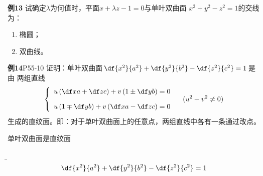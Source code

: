 \begin{frame}
	\linespread{1.2}
	\begin{exampleblock}{{\bf 例13}\hfill}
		试确定$\lambda$为何值时，平面$x+\lambda z-1=0$与单叶双曲面
		$x^2+y^2-z^2=1$的交线为：
		\begin{enumerate}
		  \item 椭圆；
		  \item 双曲线。
		\end{enumerate}
	\end{exampleblock}
\end{frame}

\begin{frame}
	\linespread{1.2}
	\begin{exampleblock}{{\bf 例14}\hfill P55-10}
		证明：单叶双曲面$\df{x^2}{a^2}+\df{y^2}{b^2}-\df{z^2}{c^2}=1$是由
		两组直线
		$$\left\{\begin{array}{l}
			u\left(\df xa+\df zc\right)+v\left(1\pm\df yb\right)=0\\[1em]
			u\left(1\mp\df yb\right)+v\left(\df xa-\df zc\right)=0
		\end{array}\right.\quad (u^2+v^2\ne 0)$$
		生成的直纹面。即：对于单叶双曲面上的任意点，两组直线中各有一条通过改点。
	\end{exampleblock}
\end{frame}

\begin{frame}{单叶双曲面是直纹面}
	\linespread{1.2}
	\begin{center}
		
		{\b $$\df{x^2}{a^2}+\df{y^2}{b^2}-\df{z^2}{c^2}=1$$}
 	\end{center}
\end{frame}